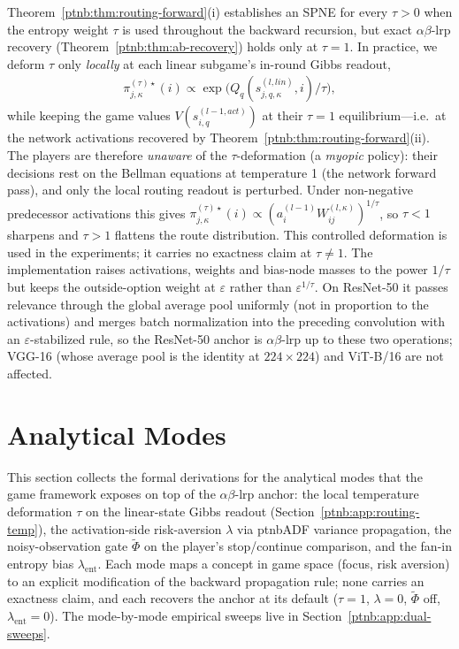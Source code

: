 Theorem~\ref{ptnb:thm:routing-forward}(i) establishes an SPNE for every $\tau > 0$ when the entropy
weight $\tau$ is used throughout the backward recursion, but exact $\alpha\beta$-\ac{lrp} recovery
(Theorem~\ref{ptnb:thm:ab-recovery}) holds only at $\tau=1$. In practice, we deform $\tau$ only
\emph{locally} at each linear subgame's in-round Gibbs readout,
\begin{align}\label{ptnb:eq:routing-gibbs-general-tau}
    \pi_{j,\kappa}^{(\tau)\star}(i) \propto \exp\!\bigl(Q_q(s_{j,q,\kappa}^{(l, lin)}, i)/\tau\bigr),
\end{align}
while keeping the game values $V(s_{i,q}^{(l-1, act)})$ at their $\tau{=}1$ equilibrium---i.e.\ at
the network activations recovered by Theorem~\ref{ptnb:thm:routing-forward}(ii). The players are
therefore \emph{unaware} of the $\tau$-deformation (a \emph{myopic} policy): their decisions rest
on the Bellman equations at temperature 1 (the network forward pass), and only the local routing
readout is perturbed. Under non-negative predecessor activations this gives
$\pi_{j,\kappa}^{(\tau)\star}(i) \propto (a_i^{(l-1)} W_{ij}^{(l,\kappa)})^{1/\tau}$, so $\tau<1$
sharpens and $\tau>1$ flattens the route distribution. This controlled deformation is used in the
experiments; it carries no exactness claim at $\tau \neq 1$. The implementation raises activations,
weights and bias-node masses to the power $1/\tau$ but keeps the outside-option weight at
$\varepsilon$ rather than $\varepsilon^{1/\tau}$. On ResNet-50 it passes relevance through the
global average pool uniformly (not in proportion to the activations) and merges batch normalization
into the preceding convolution with an $\varepsilon$-stabilized rule, so the ResNet-50 anchor is
$\alpha\beta$-\ac{lrp} up to these two operations; VGG-16 (whose average pool is the identity at
$224{\times}224$) and ViT-B/16 are not affected.
\par\medskip

\section{Analytical Modes}\label{ptnb:app:modes}

This section collects the formal derivations for the analytical modes that the game framework
exposes on top of the $\alpha\beta$-\ac{lrp} anchor: the local temperature deformation $\tau$ on
the linear-state Gibbs readout (Section~\ref{ptnb:app:routing-temp}), the activation-side risk-aversion
$\lambda$ via \ac{ptnbADF} variance propagation, the noisy-observation gate $\tilde\Phi$ on the
player's stop/continue comparison, and the fan-in entropy bias $\lambda_{\mathrm{ent}}$. Each mode
maps a concept in game space (focus, risk aversion) to an explicit modification of the backward
propagation rule; none carries an exactness claim, and each recovers the anchor at its default
($\tau = 1$, $\lambda = 0$, $\tilde\Phi$ off, $\lambda_{\mathrm{ent}} = 0$). The mode-by-mode
empirical sweeps live in Section~\ref{ptnb:app:dual-sweeps}.


